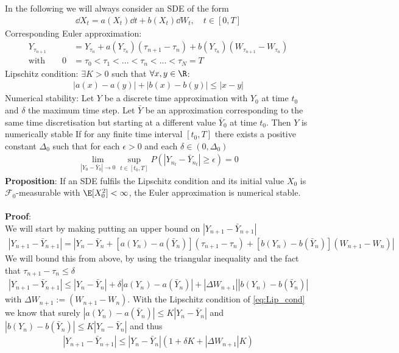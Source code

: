 
In the following we will always consider an SDE of the form
\begin{align}
\dd X_t = a(X_t)\dd t + b(X_t) \dd W_t, \quad t\in[0,T]
\end{align}
Corresponding Euler approximation:
\begin{align}
Y_{\tau_{n+1}}&= Y_{\tau_{n}}+a(Y_{\tau_{n}})(\tau_{n+1}-\tau_{n})+b(Y_{\tau_{n}})(W_{\tau_{n+1}}-W_{\tau_{n}})\\
\text{with}\qquad0 &= \tau_{0}<\tau_{1}<...<\tau_{n}<...<\tau_{N} = T
\end{align}
Lipschitz condition: $\exists K>0$ such that $\forall x,y \in \R$: 
\begin{align}
|a(x)-a(y)|+|b(x)-b(y)|\leq |x-y|\label{eq:Lip_cond}
\end{align}
Numerical stability: Let $Y$ be a discrete time approximation with $Y_0$ at time $t_0$ and $\delta$ the maximum time step. Let $\bar{Y}$ be an approximation corresponding to the same time discretisation but starting at a different value $\bar{Y}_0$ at time $t_0$. Then $Y$ is numerically stable If for any finite  time interval $[t_0,T]$ there exists a positive constant $\Delta_0$ such that for each $\epsilon>0$ and each $\delta \in (0,\Delta_0)$
\begin{align}
\lim_{|Y_0-\bar{Y}_0|\rightarrow 0}\sup_{t\in[t_0,T]} P\left(|Y_{n_t}-\bar{Y}_{n_t}|\geq \epsilon\right) =0
\end{align}
\textbf{Proposition}: If an SDE fulfils the Lipschitz condition and its initial value $X_0$ is $\mathscr{F}_0$-measurable with $\E[X_0^2]<\infty$, the Euler approximation is numerical stable.\\ \\
\textbf{Proof}:\\
We will start by making putting an upper bound on $\left|Y_{n+1}-\bar{Y}_{n+1}\right|$
\begin{align}
\left|Y_{n+1}-\bar{Y}_{n+1}\right| = \left|Y_n-\bar{Y}_{n}+[a(Y_n)-a(\bar{Y}_n)](\tau_{n+1}-\tau_n) +[b(Y_n)-b(\bar{Y}_n)](W_{n+1}-W_n)\right|
\end{align}
We will bound this from above, by using the triangular inequality and the fact that $\tau_{n+1}-\tau_n\leq \delta$
\begin{align}
\left|Y_{n+1}-\bar{Y}_{n+1}\right| \leq  \left|Y_n-\bar{Y}_{n}\right|+\delta\left|a(Y_n)-a(\bar{Y}_n)\right| +\left|\Delta W_{n+1}\right|\left|b(Y_n)-b(\bar{Y}_n)\right|
\end{align}
with $\Delta W_{n+1}:=(W_{n+1}-W_n)$. With the Lipschitz condition of \cref{eq:Lip_cond} we know that surely \mbox{$\left|a(Y_n)-a(\bar{Y}_n)\right|\leq K \left|Y_n-\bar{Y}_{n}\right|$} and \mbox{$\left|b(Y_n)-b(\bar{Y}_n)\right|\leq K \left|Y_n-\bar{Y}_{n}\right|$} and thus
\begin{align}
\left|Y_{n+1}-\bar{Y}_{n+1}\right|\leq \left|Y_n-\bar{Y}_{n}\right|(1+\delta K+|\Delta W_{n+1}|K)
\end{align}